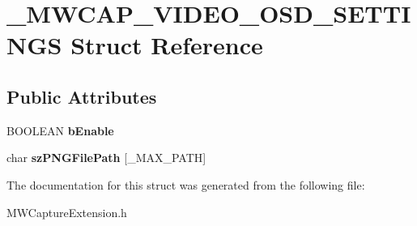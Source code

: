 \hypertarget{struct__MWCAP__VIDEO__OSD__SETTINGS}{\section{\-\_\-\-M\-W\-C\-A\-P\-\_\-\-V\-I\-D\-E\-O\-\_\-\-O\-S\-D\-\_\-\-S\-E\-T\-T\-I\-N\-G\-S Struct Reference}
\label{struct__MWCAP__VIDEO__OSD__SETTINGS}
}
\subsection*{Public Attributes}
\begin{DoxyCompactItemize}
\item 
\hypertarget{struct__MWCAP__VIDEO__OSD__SETTINGS_a7668922207edac5486aab7fc92e4f3b4}{B\-O\-O\-L\-E\-A\-N {\bfseries b\-Enable}}\label{struct__MWCAP__VIDEO__OSD__SETTINGS_a7668922207edac5486aab7fc92e4f3b4}

\item 
\hypertarget{struct__MWCAP__VIDEO__OSD__SETTINGS_ad8d722c6e9d5937777c94c267bd30e34}{char {\bfseries sz\-P\-N\-G\-File\-Path} \mbox{[}\-\_\-\-M\-A\-X\-\_\-\-P\-A\-T\-H\mbox{]}}\label{struct__MWCAP__VIDEO__OSD__SETTINGS_ad8d722c6e9d5937777c94c267bd30e34}

\end{DoxyCompactItemize}


The documentation for this struct was generated from the following file\-:\begin{DoxyCompactItemize}
\item 
M\-W\-Capture\-Extension.\-h\end{DoxyCompactItemize}
